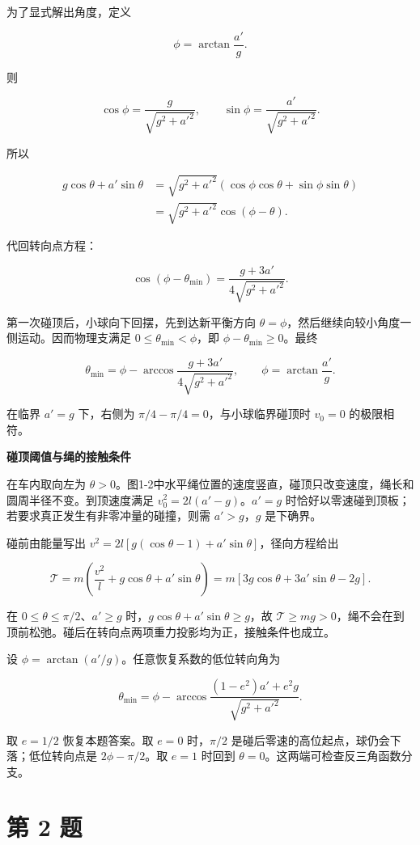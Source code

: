 \documentclass[12pt,a4paper,UTF8]{ctexart}
\begin{document}
为了显式解出角度，定义

\[\phi=\arctan\frac{a'}g.\]

则

\[\cos\phi=\frac g{\sqrt{g^2+a'^2}},\qquad
\sin\phi=\frac{a'}{\sqrt{g^2+a'^2}}.\]

所以

\[\begin{aligned}
g\cos\theta+a'\sin\theta
&=\sqrt{g^2+a'^2}
\left(\cos\phi\cos\theta+\sin\phi\sin\theta\right)\\
&=\sqrt{g^2+a'^2}\cos(\phi-\theta).
\end{aligned}\]

代回转向点方程：

\[\cos(\phi-\theta_{\min})
=\frac{g+3a'}{4\sqrt{g^2+a'^2}}.\]

第一次碰顶后，小球向下回摆，先到达新平衡方向
\(\theta=\phi\)，然后继续向较小角度一侧运动。因而物理支满足
\(0\leq\theta_{\min}<\phi\)，即 \(\phi-\theta_{\min}\geq0\)。最终

\[\boxed{
\theta_{\min}
=\phi-\arccos\frac{g+3a'}{4\sqrt{g^2+a'^2}},
\qquad \phi=\arctan\frac{a'}g
}.\]

在临界 \(a'=g\) 下，右侧为 \(\pi/4-\pi/4=0\)，与小球临界碰顶时 \(v_0=0\)
的极限相符。

\textbf{碰顶阈值与绳的接触条件}

在车内取向左为
\(\theta>0\)。图1-2中水平绳位置的速度竖直，碰顶只改变速度，绳长和圆周半径不变。到顶速度满足
\(v_0^2=2l(a'-g)\)。\(a'=g\)
时恰好以零速碰到顶板；若要求真正发生有非零冲量的碰撞，则需
\(a'>g\)，\(g\) 是下确界。

碰前由能量写出 \(v^2=2l[g(\cos\theta-1)+a'\sin\theta]\)，径向方程给出

\[\mathcal T=m\left(\frac{v^2}{l}+g\cos\theta+a'\sin\theta\right)
=m[3g\cos\theta+3a'\sin\theta-2g].\]

在 \(0\le\theta\le\pi/2\)、\(a'\ge g\)
时，\(g\cos\theta+a'\sin\theta\ge g\)，故
\(\mathcal T\ge mg>0\)，绳不会在到顶前松弛。碰后在转向点两项重力投影均为正，接触条件也成立。

设 \(\phi=\arctan(a'/g)\)。任意恢复系数的低位转向角为

\[\theta_{\min}=\phi-\arccos\frac{(1-e^2)a'+e^2g}{\sqrt{g^2+a'^2}}.\]

取 \(e=1/2\) 恢复本题答案。取 \(e=0\) 时，\(\pi/2\)
是碰后零速的高位起点，球仍会下落；低位转向点是 \(2\phi-\pi/2\)。取
\(e=1\) 时回到 \(\theta=0\)。这两端可检查反三角函数分支。

\newpage

\section{第 2 题}\label{ux7b2c-2-ux9898}
\end{document}
